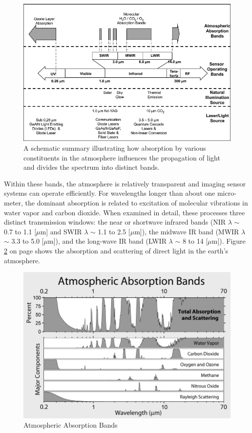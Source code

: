 \begin{figure}[ht!]
\centering
\includegraphics[scale = 0.8]{chapters/img/intro_atmosphere.png}
\caption{A schematic summary illustrating how absorption by various constituents in the atmosphere influences the propagation of light and divides the spectrum into distinct bands.}
\label{fig:intro_atmosphere}
\end{figure}

Within these bands, the atmosphere is relatively transparent and imaging sensor systems can operate efficiently. For wavelengths longer than about one micro-meter, the dominant absorption is related to excitation of molecular vibrations in water vapor and carbon dioxide. When examined in detail, these processes three distinct transmission windows: the near or shortwave infrared bands (\acs{NIR} $\lambda$ $\sim$ 0.7 to 1.1 [$\mu$m] and \acs{SWIR} $\lambda$ $\sim$ 1.1 to 2.5 [$\mu$m]), the midwave IR band (\acs{MWIR} $\lambda$ $\sim$ 3.3 to 5.0 [$\mu$m]), and the long-wave IR band (\acs{LWIR} $\lambda$ $\sim$ 8 to 14 [$\mu$m]). Figure \ref{fig:intro_atmosphere_bands} on page \pageref{fig:intro_atmosphere_bands} shows the absorption and scattering of direct light in the earth's atmosphere.

\begin{figure}[ht!]
\centering
\includegraphics[scale = 0.45]{chapters/img/intro_atmosphere_bands.png}
\caption{Atmospheric Absorption Bands}
\label{fig:intro_atmosphere_bands}
\end{figure}

